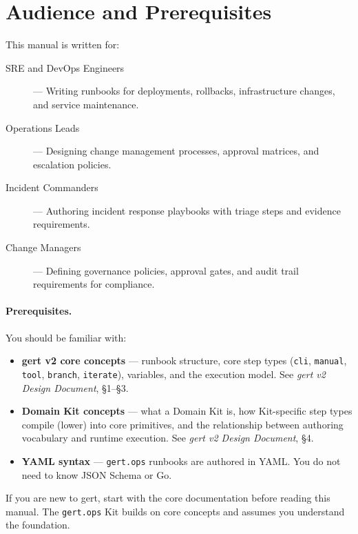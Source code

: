\section{Audience and Prerequisites}

This manual is written for:

\begin{description}
  \item[SRE and DevOps Engineers] — Writing runbooks for deployments, rollbacks, infrastructure changes, and service maintenance.
  \item[Operations Leads] — Designing change management processes, approval matrices, and escalation policies.
  \item[Incident Commanders] — Authoring incident response playbooks with triage steps and evidence requirements.
  \item[Change Managers] — Defining governance policies, approval gates, and audit trail requirements for compliance.
\end{description}

\paragraph{Prerequisites.}
You should be familiar with:

\begin{itemize}
  \item \textbf{gert v2 core concepts} — runbook structure, core step types (\texttt{cli}, \texttt{manual}, \texttt{tool}, \texttt{branch}, \texttt{iterate}), variables, and the execution model. See \emph{gert v2 Design Document}, §1--§3.
  \item \textbf{Domain Kit concepts} — what a Domain Kit is, how Kit-specific step types compile (lower) into core primitives, and the relationship between authoring vocabulary and runtime execution. See \emph{gert v2 Design Document}, §4.
  \item \textbf{YAML syntax} — \texttt{gert.ops} runbooks are authored in YAML. You do not need to know JSON Schema or Go.
\end{itemize}

If you are new to gert, start with the core documentation before reading this manual. The \texttt{gert.ops} Kit builds on core concepts and assumes you understand the foundation.

